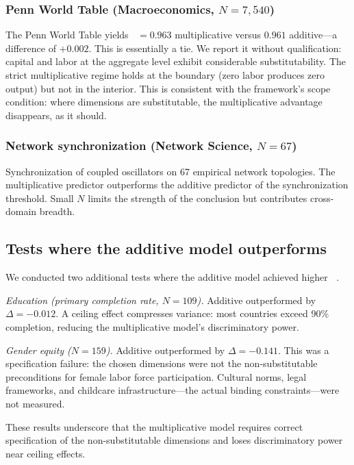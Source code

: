 \documentclass[12pt, a4paper]{article}
\theoremstyle{definition}
\theoremstyle{remark}
\DeclareMathOperator{\Spearman}{\rho_s}
\begin{document}
\subsubsection{Penn World Table (Macroeconomics, $N = 7{,}540$)}

The Penn World Table \cite{feenstra2015} yields $\Spearman = 0.963$ multiplicative versus $0.961$ additive---a difference of $+0.002$. This is essentially a tie. We report it without qualification: capital and labor at the aggregate level exhibit considerable substitutability. The strict multiplicative regime holds at the boundary (zero labor produces zero output) but not in the interior. This is consistent with the framework's scope condition: where dimensions are substitutable, the multiplicative advantage disappears, as it should.

\subsubsection{Network synchronization (Network Science, $N = 67$)}

Synchronization of coupled oscillators on 67 empirical network topologies. The multiplicative predictor outperforms the additive predictor of the synchronization threshold. Small $N$ limits the strength of the conclusion but contributes cross-domain breadth.

\subsection{Tests where the additive model outperforms}

We conducted two additional tests where the additive model achieved higher $\Spearman$.

\textit{Education (primary completion rate, $N = 109$).} Additive outperformed by $\Delta = -0.012$. A ceiling effect compresses variance: most countries exceed 90\% completion, reducing the multiplicative model's discriminatory power.

\textit{Gender equity ($N = 159$).} Additive outperformed by $\Delta = -0.141$. This was a specification failure: the chosen dimensions were not the non-substitutable preconditions for female labor force participation. Cultural norms, legal frameworks, and childcare infrastructure---the actual binding constraints---were not measured.

These results underscore that the multiplicative model requires correct specification of the non-substitutable dimensions and loses discriminatory power near ceiling effects.
\end{document}
